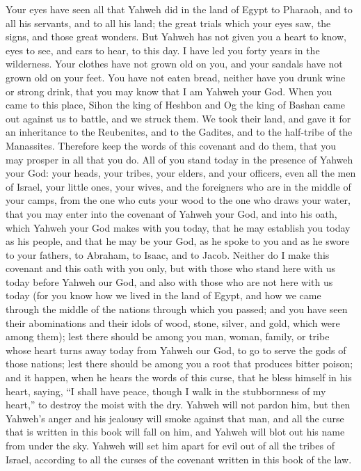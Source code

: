 Your eyes have seen all that Yahweh did in the land of Egypt to Pharaoh,
and to all his servants, and to all his land;  the great
trials which your eyes saw, the signs, and those great wonders.
 But Yahweh has not given you a heart to know, eyes to
see, and ears to hear, to this day.  I have led you forty
years in the wilderness. Your clothes have not grown old on you, and
your sandals have not grown old on your feet.  You have
not eaten bread, neither have you drunk wine or strong drink, that you
may know that I am Yahweh your God.  When you came to this
place, Sihon the king of Heshbon and Og the king of Bashan came out
against us to battle, and we struck them.  We took their
land, and gave it for an inheritance to the Reubenites, and to the
Gadites, and to the half-tribe of the Manassites. 
Therefore keep the words of this covenant and do them, that you may
prosper in all that you do.  All of you stand today in
the presence of Yahweh your God: your heads, your tribes, your elders,
and your officers, even all the men of Israel,  your
little ones, your wives, and the foreigners who are in the middle of
your camps, from the one who cuts your wood to the one who draws your
water,  that you may enter into the covenant of Yahweh
your God, and into his oath, which Yahweh your God makes with you today,
 that he may establish you today as his people, and that
he may be your God, as he spoke to you and as he swore to your fathers,
to Abraham, to Isaac, and to Jacob.  Neither do I make
this covenant and this oath with you only,  but with
those who stand here with us today before Yahweh our God, and also with
those who are not here with us today  (for you know how
we lived in the land of Egypt, and how we came through the middle of the
nations through which you passed;  and you have seen
their abominations and their idols of wood, stone, silver, and gold,
which were among them);  lest there should be among you
man, woman, family, or tribe whose heart turns away today from Yahweh
our God, to go to serve the gods of those nations; lest there should be
among you a root that produces bitter poison;  and it
happen, when he hears the words of this curse, that he bless himself in
his heart, saying, ``I shall have peace, though I walk in the
stubbornness of my heart,'' to destroy the moist with the dry.
 Yahweh will not pardon him, but then Yahweh's anger and
his jealousy will smoke against that man, and all the curse that is
written in this book will fall on him, and Yahweh will blot out his name
from under the sky.  Yahweh will set him apart for evil
out of all the tribes of Israel, according to all the curses of the
covenant written in this book of the law.

